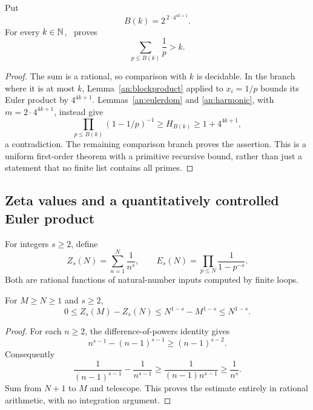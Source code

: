 \begin{theorem}\label{an:primeharmonic}
Put
\[
 B(k)=2^{\,2\cdot4^{4k+1}}.
\]
For every $k\in\mathbb N$, \ipra\ proves
\[
 \sum_{p\le B(k)}\frac1p>k.
\]
\end{theorem}
\begin{proof}
The sum is a rational, so comparison with $k$ is decidable. In the branch where it is at most $k$, Lemma~\ref{an:blockproduct} applied to $x_i=1/p$ bounds its Euler product by $4^{4k+1}$. Lemmas~\ref{an:eulerdom} and \ref{an:harmonic}, with $m=2\cdot4^{4k+1}$, instead give
\[
 \prod_{p\le B(k)}(1-1/p)^{-1}\ge H_{B(k)}
 \ge1+4^{4k+1},
\]
a contradiction. The remaining comparison branch proves the assertion. This is a uniform first-order theorem with a primitive recursive bound, rather than just a statement that no finite list contains all primes.
\end{proof}

\subsection{Zeta values and a quantitatively controlled Euler product}
For integers $s\ge2$, define
\[
 Z_s(N)=\sum_{n=1}^N\frac1{n^s},\qquad
 E_s(N)=\prod_{p\le N}\frac1{1-p^{-s}}.
\]
Both are rational functions of natural-number inputs computed by finite loops.

\begin{lemma}\label{an:zetatail}
For $M\ge N\ge1$ and $s\ge2$,
\[
 0\le Z_s(M)-Z_s(N)\le N^{1-s}-M^{1-s}\le N^{1-s}.
\]
\end{lemma}
\begin{proof}
For each $n\ge2$, the difference-of-powers identity gives
\[
 n^{s-1}-(n-1)^{s-1}\ge(n-1)^{s-2}.
\]
Consequently
\[
 \frac1{(n-1)^{s-1}}-\frac1{n^{s-1}}
 \ge\frac1{(n-1)n^{s-1}}\ge\frac1{n^s}.
\]
Sum from $N+1$ to $M$ and telescope. This proves the estimate entirely in rational arithmetic, with no integration argument.
\end{proof}

